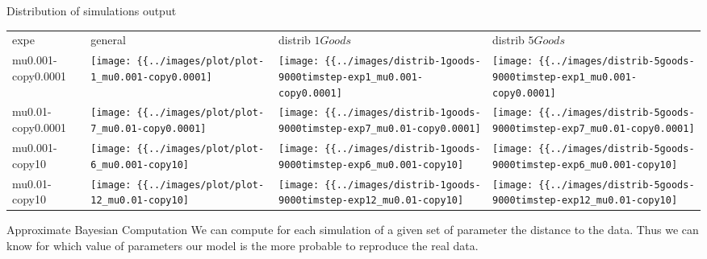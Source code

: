 \documentclass[12pt, notes=show]{beamer}
\begin{document}
\begin{frame}{Distribution of simulations output}
    \tiny

	\begin{table}
	    \begin{tabular}{m{2.1cm}m{2.1cm}m{2.1cm}m{2.1cm}}
		expe & general & distrib $1Goods$ & distrib $5Goods$ \\
		mu0.001-copy0.0001 & 

		\texttt{[image: \{\{../images/plot/plot-1\_mu0.001-copy0.0001]}}} &
		\texttt{[image: \{\{../images/distrib-1goods-9000timstep-exp1\_mu0.001-copy0.0001]}}} &
		\texttt{[image: \{\{../images/distrib-5goods-9000timstep-exp1\_mu0.001-copy0.0001]}}} \\

		mu0.01-copy0.0001 & 

		\texttt{[image: \{\{../images/plot/plot-7\_mu0.01-copy0.0001]}}} &
		\texttt{[image: \{\{../images/distrib-1goods-9000timstep-exp7\_mu0.01-copy0.0001]}}} &
		\texttt{[image: \{\{../images/distrib-5goods-9000timstep-exp7\_mu0.01-copy0.0001]}}} \\


		mu0.001-copy10 & 

		\texttt{[image: \{\{../images/plot/plot-6\_mu0.001-copy10]}}} &
		\texttt{[image: \{\{../images/distrib-1goods-9000timstep-exp6\_mu0.001-copy10]}}} &
		\texttt{[image: \{\{../images/distrib-5goods-9000timstep-exp6\_mu0.001-copy10]}}} \\

		mu0.01-copy10 & 

		\texttt{[image: \{\{../images/plot/plot-12\_mu0.01-copy10]}}} &
		\texttt{[image: \{\{../images/distrib-1goods-9000timstep-exp12\_mu0.01-copy10]}}} &
		\texttt{[image: \{\{../images/distrib-5goods-9000timstep-exp12\_mu0.01-copy10]}}} \\

	    \end{tabular}
	\end{table}

\end{frame}

\begin{frame}{Approximate Bayesian Computation}
    We can compute for each simulation of a given set of parameter the distance to the data.
    Thus we can know for which value of parameters our model is the more probable to reproduce the real data.
\end{frame}
\end{document}
